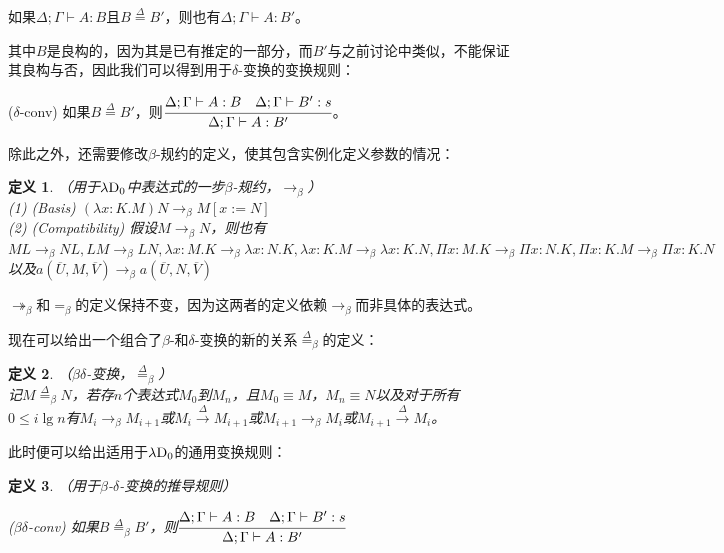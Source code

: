 \documentclass[UTF8]{article}
\newtheorem{thm}{定义}[section]
\begin{document}
		如果$\Delta;\Gamma\vdash A:B$且$B\stackrel{\Delta}{=}B'$，则也有$\Delta;\Gamma\vdash A:B'$。
		
		其中$B$是良构的，因为其是已有推定的一部分，而$B'$与之前讨论中类似，不能保证其良构与否，因此我们可以得到用于$\delta$-变换的变换规则：
		
		($\delta$-conv) 如果$B\stackrel{\Delta}{=}B'$，则$\cfrac{\Delta;\Gamma\vdash A:B\ \ \ \Delta;\Gamma\vdash B':s}{\Delta;\Gamma\vdash A:B'}$。
		
		除此之外，还需要修改$\beta$-规约的定义，使其包含实例化定义参数的情况：
		
		\begin{thm}（用于$\lambda{\rm D_0}$中表达式的一步$\beta$-规约，$\rightarrow_\beta$）\\
			(1) (Basis) $(\lambda x:K.M)N\rightarrow_\beta M\left[x:=N\right]$\\
			(2) (Compatibility) 假设$M\rightarrow_\beta N$，则也有$ML\rightarrow_\beta NL,LM\rightarrow_\beta LN,\lambda x:M.K\rightarrow_\beta\lambda x:N.K,\lambda x:K.M\rightarrow_\beta\lambda x:K.N,\Pi x:M.K\rightarrow_\beta\Pi x:N.K,\Pi x:K.M\rightarrow_\beta\Pi x:K.N$以及$a(\overline{U},M,\overline{V})\rightarrow_\beta a(\overline{U},N,\overline{V})$ 
		\end{thm}
	
		$\twoheadrightarrow_\beta$和$=_\beta$的定义保持不变，因为这两者的定义依赖$\rightarrow_\beta$而非具体的表达式。
		
		现在可以给出一个组合了$\beta$-和$\delta$-变换的新的关系$\stackrel{\Delta}{=}_\beta$的定义：
		
		\begin{thm}（$\beta\delta$-变换，$\stackrel{\Delta}{=}_\beta$）\\
			记$M\stackrel{\Delta}{=}_\beta N$，若存$n$个表达式$M_0$到$M_n$，且$M_0\equiv M$，$M_n\equiv N$以及对于所有$0\le i\lg n$有$M_i\rightarrow_\beta M_{i+1}$或$M_i\stackrel{\Delta}{\rightarrow}M_{i+1}$或$M_{i+1}\rightarrow_\beta M_i$或$M_{i+1}\stackrel{\Delta}{\rightarrow}M_i$。
		\end{thm}
	
		此时便可以给出适用于$\lambda{\rm D_0}$的通用变换规则：
		
		\begin{thm}（用于$\beta$-$\delta$-变换的推导规则）
			
			($\beta\delta$-conv) 如果$B\stackrel{\Delta}{=}_\beta B'$，则$\cfrac{\Delta;\Gamma\vdash A:B\ \ \ \Delta;\Gamma\vdash B':s}{\Delta;\Gamma\vdash A:B'}$
		\end{thm}
	
\end{document}
